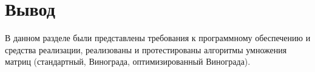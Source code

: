 \clearpage

\section*{Вывод}

В данном разделе были представлены требования к программному обеспечению и средства реализации, реализованы и протестированы алгоритмы умножения матриц (стандартный, Винограда, оптимизированный Винограда).